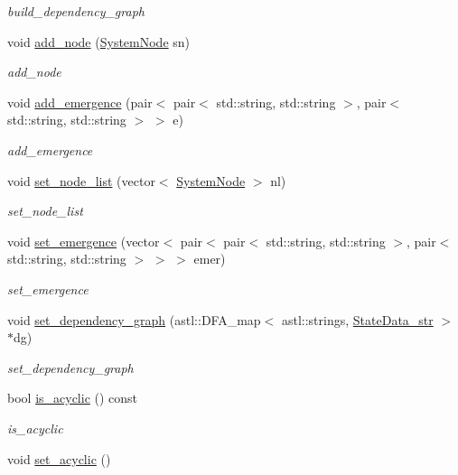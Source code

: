 \begin{DoxyCompactItemize}
\begin{DoxyCompactList}\small\item\em build\+\_\+dependency\+\_\+graph \end{DoxyCompactList}\item 
void \hyperlink{class_system_a8a9ad6506e7e08154b32fb5b0cc203c7}{add\+\_\+node} (\hyperlink{class_system_node}{System\+Node} sn)
\begin{DoxyCompactList}\small\item\em add\+\_\+node \end{DoxyCompactList}\item 
void \hyperlink{class_system_a3ad74a1f0027cf04df6d0befa0eb9ff7}{add\+\_\+emergence} (pair$<$ pair$<$ std\+::string, std\+::string $>$, pair$<$ std\+::string, std\+::string $>$ $>$ e)
\begin{DoxyCompactList}\small\item\em add\+\_\+emergence \end{DoxyCompactList}\item 
void \hyperlink{class_system_af320c45d04c78caf00b7fb5ed767a026}{set\+\_\+node\+\_\+list} (vector$<$ \hyperlink{class_system_node}{System\+Node} $>$ nl)
\begin{DoxyCompactList}\small\item\em set\+\_\+node\+\_\+list \end{DoxyCompactList}\item 
void \hyperlink{class_system_af5d54ed7ec28113209452d0f854f161d}{set\+\_\+emergence} (vector$<$ pair$<$ pair$<$ std\+::string, std\+::string $>$, pair$<$ std\+::string, std\+::string $>$ $>$ $>$ emer)
\begin{DoxyCompactList}\small\item\em set\+\_\+emergence \end{DoxyCompactList}\item 
void \hyperlink{class_system_af3c648073ce697f79df86892cf62fe99}{set\+\_\+dependency\+\_\+graph} (astl\+::\+D\+F\+A\+\_\+map$<$ astl\+::strings, \hyperlink{class_state_data__str}{State\+Data\+\_\+str} $>$ $\ast$dg)
\begin{DoxyCompactList}\small\item\em set\+\_\+dependency\+\_\+graph \end{DoxyCompactList}\item 
bool \hyperlink{class_system_a02307398de63c4947e99c8b59155b95d}{is\+\_\+acyclic} () const 
\begin{DoxyCompactList}\small\item\em is\+\_\+acyclic \end{DoxyCompactList}\item 
void \hyperlink{class_system_aea6aa0ba4dbe8f139a13d5b6de2db4bd}{set\+\_\+acyclic} ()\hypertarget{class_system_aea6aa0ba4dbe8f139a13d5b6de2db4bd}{}\label{class_system_aea6aa0ba4dbe8f139a13d5b6de2db4bd}


\end{DoxyCompactItemize}

